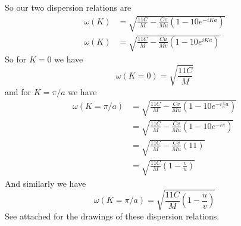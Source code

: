 \documentclass[11pt]{article}
\numberwithin{equation}{section}
\begin{document}
So our two dispersion relations are
\begin{align*}
\omega(K) &= \sqrt{\frac{11C}{M} -\frac{Cv}{Mu}\left(1 - 10e^{-iKa}\right)}\\
\omega(K) &= \sqrt{\frac{11C}{M} - \frac{Cu}{Mv}\left(1 - 10e^{iKa}\right)}
\end{align*}
So for $K=0$ we have
$$\omega(K=0) = \sqrt{\frac{11C}{M}}$$
and for $K=\pi/a$ we have
\begin{align*}
\omega(K=\pi/a) &= \sqrt{\frac{11C}{M} -\frac{Cv}{Mu}\left(1 - 10e^{-i\frac{\pi}{a}a}\right)}\\
&= \sqrt{\frac{11C}{M} -\frac{Cv}{Mu}\left(1 - 10e^{-i\pi}\right)}\\
&= \sqrt{\frac{11C}{M} -\frac{Cv}{Mu}\left(11\right)}\\
&= \sqrt{\frac{11C}{M}\left(1-\frac{v}{u}\right)}
\end{align*}
And similarly we have
$$\omega(K=\pi/a)  = \sqrt{\frac{11C}{M}\left(1-\frac{u}{v}\right)}$$
See attached for the drawings of these dispersion relations. 
\end{document}
